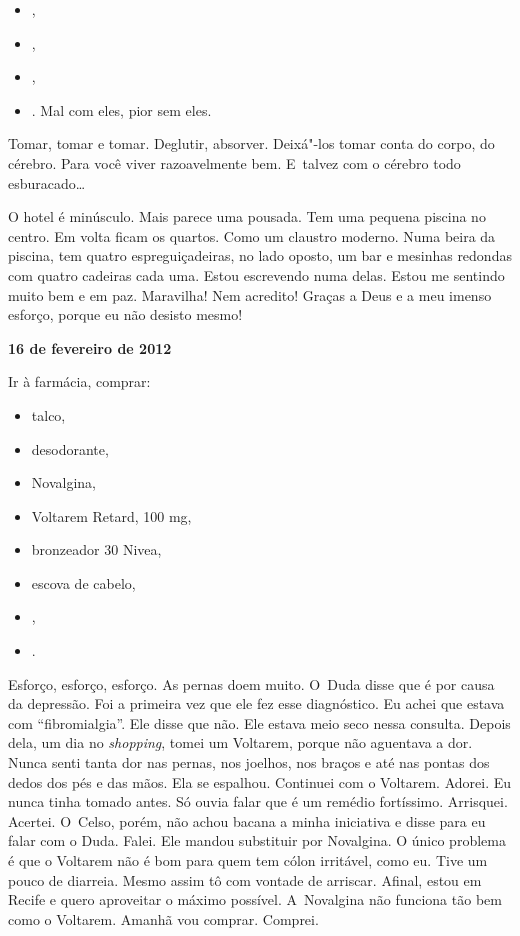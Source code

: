 \begin{itemize}
\item
  ,
\item
  ,
\item
    ,
\item
      . Mal com eles, pior sem eles.
\end{itemize}
Tomar, tomar e tomar. Deglutir, absorver. Deixá"-los tomar conta do
corpo, do cérebro. Para você viver razoavelmente bem. E~talvez com o
cérebro todo esburacado…

O hotel é minúsculo. Mais parece uma pousada. Tem uma pequena piscina no
centro. Em volta ficam os quartos. Como um claustro moderno. Numa beira
da piscina, tem quatro espreguiçadeiras, no lado oposto, um bar e
mesinhas redondas com quatro cadeiras cada uma. Estou escrevendo numa
delas. Estou me sentindo muito bem e em paz. Maravilha! Nem acredito!
Graças a Deus e a meu imenso esforço, porque eu não desisto mesmo!

\begin{flushright}\textbf{}\end{flushright}

\begin{flushright}\textbf{16 de fevereiro de 2012}\end{flushright}


Ir à farmácia, comprar:

\begin{itemize}
\item
  talco,
\item
  desodorante,
\item
  Novalgina,
\item
  Voltarem Retard, 100 mg,
\item
  bronzeador 30 Nivea,
\item
  escova de cabelo,
\item
  ,
\item
   .
\end{itemize}
Esforço, esforço, esforço. As pernas doem muito. O~Duda disse que é por
causa da depressão. Foi a primeira vez que ele fez esse diagnóstico. Eu
achei que estava com ``fibromialgia''. Ele disse que não. Ele estava
meio seco nessa consulta. Depois dela, um dia no \emph{shopping}, tomei
um Voltarem, porque não aguentava a dor. Nunca senti tanta dor nas
pernas, nos joelhos, nos braços e até nas pontas dos dedos dos pés e das
mãos. Ela se espalhou. Continuei com o Voltarem. Adorei. Eu nunca tinha
tomado antes. Só ouvia falar que é um remédio fortíssimo. Arrisquei.
Acertei. O~Celso, porém, não achou bacana a minha iniciativa e disse
para eu falar com o Duda. Falei. Ele mandou substituir por Novalgina. O
único problema é que o Voltarem não é bom para quem tem cólon irritável,
como eu. Tive um pouco de diarreia. Mesmo assim tô com vontade de
arriscar. Afinal, estou em Recife e quero aproveitar o máximo possível.
A~Novalgina não funciona tão bem como o Voltarem. Amanhã vou comprar.
Comprei.


